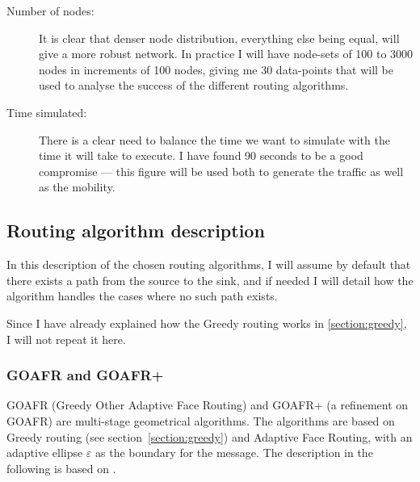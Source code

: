 \begin{description}
\item[Number of nodes:] It is clear that denser node distribution, everything else being equal, will give a more robust network. In practice I will have node-sets of 100 to 3000 nodes in increments of 100 nodes, giving me 30 data-points that will be used to analyse the success of the different routing algorithms.  

\item[Time simulated:] There is a clear need to balance the time we want to simulate with the time it will take to execute. I have found 90 seconds to be a good compromise --- this figure will be used both to generate the traffic as well as the mobility.
\end{description}


\subsection{Routing algorithm description}
\label{section:routing_algorithm}
In this description of the chosen routing algorithms, I will assume by default that there exists a path from the source to the sink, and if needed I will detail how the algorithm handles the cases where no such path exists.

Since I have already explained how the Greedy routing works in \ref{section:greedy}, I will not repeat it here.

\subsubsection{GOAFR and GOAFR+}


GOAFR \cite{gopher} (Greedy Other Adaptive Face Routing) and GOAFR+ \cite{gopher+} (a refinement on GOAFR) are multi-stage geometrical algorithms. The algorithms are based on Greedy routing (see section~\ref{section:greedy}) and Adaptive Face Routing, with an adaptive ellipse $\varepsilon$ as the boundary for the message. The description in the following is based on \cite{gopher}.

